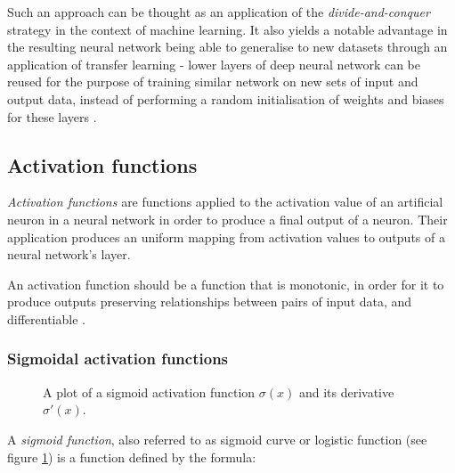 Such an approach can be thought as an application of the \emph{divide-and-conquer} strategy in the context of machine learning. It also yields a notable advantage in the resulting neural network being able to generalise to new datasets through an application of transfer learning - lower layers of deep neural network can be reused for the purpose of training similar network on new sets of input and output data, instead of performing a random initialisation of weights and biases for these layers \cite{handson_geron}.

\subsection{Activation functions}

\emph{Activation functions} are functions applied to the activation value of an artificial neuron in a neural network in order to produce a final output of a neuron. Their application produces an uniform mapping from activation values to outputs of a neural network's layer.

An activation function should be a function that is monotonic, in order for it to produce outputs preserving relationships between pairs of input data, and differentiable \cite{deep_learning_from_scratch}.

\subsubsection{Sigmoidal activation functions}

\begin{figure}
\centering
{}
\caption{A plot of a sigmoid activation function $\sigma(x)$ and its derivative $\sigma '(x)$.} \label{sigmoid:chart}
\end{figure}

A \emph{sigmoid function}, also referred to as sigmoid curve or logistic function (see figure \ref{sigmoid:chart}) is a function defined by the formula:

